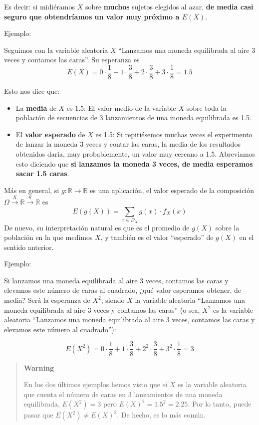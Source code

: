 \documentclass[
  spanish,
  letterpaper,
  DIV=11,
  numbers=noendperiod]{scrreprt}
\begin{document}
\begin{tcolorbox}
Es decir: si midiéramos \(X\) sobre \textbf{muchos} sujetos elegidos al
azar, \textbf{de media casi seguro que obtendríamos un valor muy próximo
a \(E(X)\)}.

Ejemplo:

Seguimos con la variable aleatoria \(X\) ``Lanzamos una moneda
equilibrada al aire 3 veces y contamos las caras''. Su esperanza es \[
E(X)= 0\cdot \frac{1}{8}+1\cdot \frac{3}{8}+2\cdot \frac{3}{8}+3\cdot \frac{1}{8}=1.5
\]

Esto nos dice que:

\begin{itemize}
\item
  La \textbf{media} de \(X\) es 1.5: El valor medio de la variable \(X\)
  sobre toda la población de secuencias de 3 lanzamientos de una moneda
  equilibrada es 1.5.
\item
  El \textbf{valor esperado} de \(X\) es 1.5: Si repitiésemos muchas
  veces el experimento de lanzar la moneda 3 veces y contar las caras,
  la media de los resultados obtenidos daría, muy probablemente, un
  valor muy cercano a 1.5. Abreviamos esto diciendo que \textbf{si
  lanzamos la moneda 3 veces, de media esperamos sacar 1.5 caras}.
\end{itemize}

Más en general, si \(g:\mathbb{R}\to  \mathbb{R}\) es una aplicación, el
valor esperado de la composición
\(\Omega \stackrel{X}{\longrightarrow} \mathbb{R}\stackrel{g}{\longrightarrow}\mathbb{R}\)
es \[
E(g(X))=\sum_{x\in D_X} g(x)\cdot f_X(x)  
\] De nuevo, su interpretación natural es que es el promedio de \(g(X)\)
sobre la población en la que medimos \(X\), y también es el valor
``esperado'' de \(g(X)\) en el sentido anterior.

Ejemplo:

Si lanzamos una moneda equilibrada al aire 3 veces, contamos las caras y
elevamos este número de caras al cuadrado, ¿qué valor esperamos obtener,
de media? Será la esperanza de \(X^2\), siendo \(X\) la variable
aleatoria ``Lanzamos una moneda equilibrada al aire 3 veces y contamos
las caras'' (o sea, \(X^2\) es la variable aleatoria ``Lanzamos una
moneda equilibrada al aire 3 veces, contamos las caras y elevamos este
número al cuadrado''):

\[
E(X^2)= 0\cdot \frac{1}{8}+1\cdot \frac{3}{8}+2^2\cdot \frac{3}{8}+3^2\cdot \frac{1}{8}=3
\]

\begin{quote}
\textbf{Warning}

En los dos últimos ejemplos hemos visto que si \(X\) es la variable
aleatoria que cuenta el número de caras en 3 lanzamientos de una moneda
equilibrada, \(E(X^2)=3\) pero \(E(X)^2=1.5^2=2.25\). Por lo tanto,
puede pasar que \(E(X^2) \neq E(X)^2\). De hecho, es lo más común.


\end{quote}
\end{tcolorbox}
\end{document}
